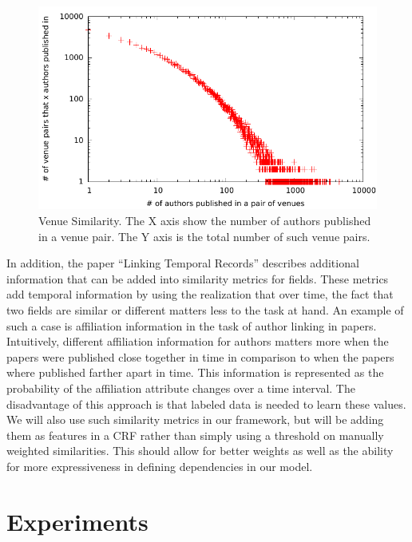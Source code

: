\documentclass[twocolumn,letterpaper]{article}
\begin{document}
\begin{figure}
  \centering
  \includegraphics[width=\columnwidth]{venuepair}
  \caption{Venue Similarity.  The X axis show the number of authors published in a venue pair.  The Y axis is the total number of such venue pairs.}
  \label{fig:venue}
\end{figure}

In addition, the paper ``Linking Temporal Records'' \cite{DBLP:journals/fcsc/LiDMS12} describes additional information that can be added into similarity metrics for fields. These metrics add temporal information by using the realization that over time, the fact that two fields are similar or different matters less to the task at hand. An example of such a case is affiliation information in the task of author linking in papers. Intuitively, different affiliation information for authors matters more when the papers were published close together in time in comparison to when the papers where published farther apart in time. This information is represented as the probability of the affiliation attribute changes over a time interval. The disadvantage of this approach is that labeled data is needed to learn these values.  We will also use such similarity metrics in our framework, but will be adding them as features in a CRF rather than simply using a threshold on manually weighted similarities. This should allow for better weights as well as the ability for more expressiveness in defining dependencies in our model.

\section{Experiments} %
\label{sec:proposed_experiments}
\end{document}
